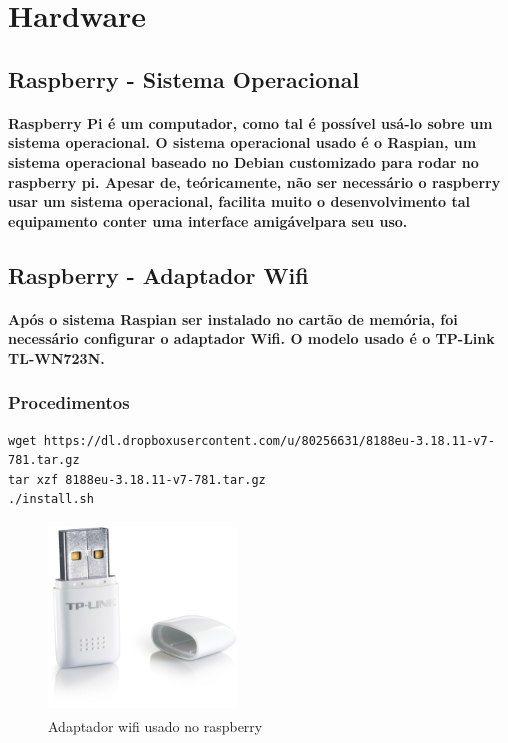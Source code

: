 
\section{Hardware}
\label{Sec:5-hardware}
\subsection{Raspberry - Sistema Operacional}
\paragraph{
	Raspberry Pi é um computador, como tal é possível usá-lo sobre um sistema operacional. O sistema operacional usado é o Raspian, um sistema operacional baseado no Debian customizado para rodar no raspberry pi. Apesar de, teóricamente, não ser necessário o raspberry usar um sistema operacional, facilita muito o desenvolvimento tal equipamento conter uma interface amigávelpara seu uso.
}
\subsection{Raspberry - Adaptador Wifi}
\paragraph{
	Após o sistema Raspian ser instalado no cartão de memória, foi necessário configurar o adaptador Wifi. O modelo usado é o TP-Link TL-WN723N.
}

\subsubsection{Procedimentos}
\begin{lstlisting}
wget https://dl.dropboxusercontent.com/u/80256631/8188eu-3.18.11-v7-781.tar.gz
tar xzf 8188eu-3.18.11-v7-781.tar.gz
./install.sh
\end{lstlisting}

\begin{figure}[H]
\centering
\includegraphics[width=5cm,height=5cm,keepaspectratio]{figuras/wifi-adapter.jpg}
\caption{\label{fig:wifi-adapter} Adaptador wifi usado no raspberry}
\end{figure}
